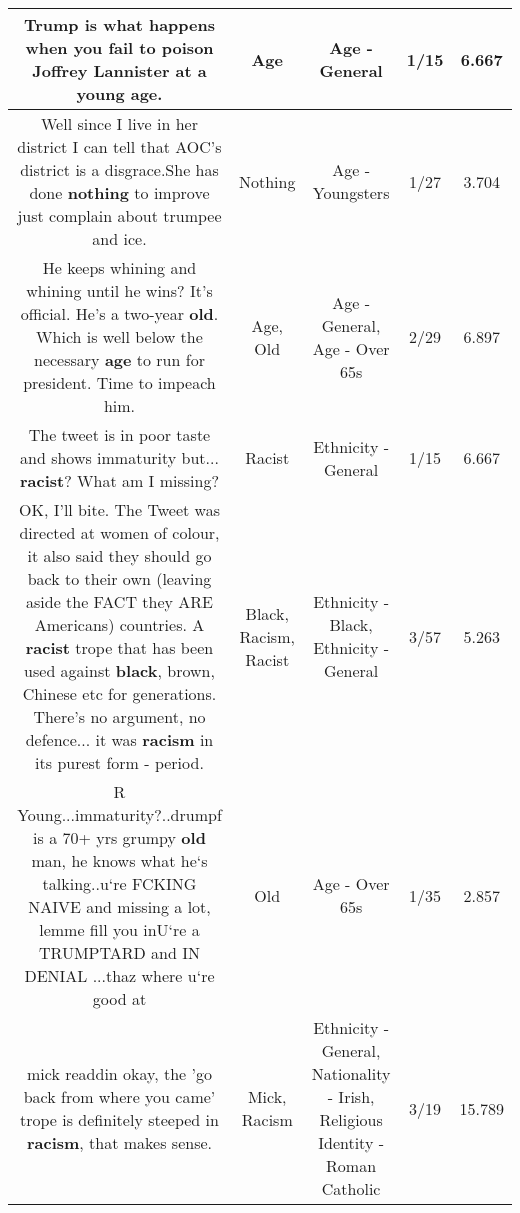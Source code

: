 \documentclass[11pt]{article}
\newlength\mylength
\begin{document}
\begin{center}
\begin{longtable}{|C{.65\mylength}|C{.30\mylength}|C{.12\mylength}|C{.12\mylength}|C{.12\mylength}|}
  \small Trump is what happens when you fail to poison Joffrey Lannister at a young \textbf{age}.\normalsize   & Age & Age - General & 1/15 & 6.667 \\  \hline
  \small Well since I live in her district I can tell that AOC's district is a disgrace.She has done \textbf{nothing} to improve just complain about trumpee and ice.\normalsize   & Nothing & Age - Youngsters & 1/27 & 3.704 \\  \hline
  \small He keeps whining and whining until he wins? It's official. He's a two-year \textbf{old}. Which is well below the necessary \textbf{age} to run for president. Time to impeach him.\normalsize   & Age, Old & Age - General, Age - Over 65s & 2/29 & 6.897 \\  \hline
  \small The tweet is in poor taste and shows immaturity but... \textbf{racist}?  What am I missing?\normalsize   & Racist & Ethnicity - General & 1/15 & 6.667 \\  \hline
  \small OK, I'll bite. The Tweet was directed at women of colour, it also said they should go back to their own (leaving aside the FACT they ARE Americans) countries. A \textbf{racist} trope that has been used against \textbf{black}, brown, Chinese etc for generations. There's no argument, no defence... it was \textbf{racism} in its purest form - period.\normalsize   & Black, Racism, Racist & Ethnicity - Black, Ethnicity - General & 3/57 & 5.263 \\  \hline
  \small R Young...immaturity?..drumpf is a 70+ yrs grumpy \textbf{old} man, he knows what he`s talking..u`re FCKING NAIVE and missing a lot, lemme fill you inU`re a TRUMPTARD and IN DENIAL ...thaz where u`re good at\normalsize   & Old & Age - Over 65s & 1/35 & 2.857 \\  \hline
  \small mick readdin okay, the 'go back from where you came' trope is definitely steeped in \textbf{racism}, that makes sense.\normalsize   & Mick, Racism & Ethnicity - General, Nationality - Irish, Religious Identity - Roman Catholic & 3/19 & 15.789 \\  \hline

\end{longtable}
\end{center}
\end{document}
